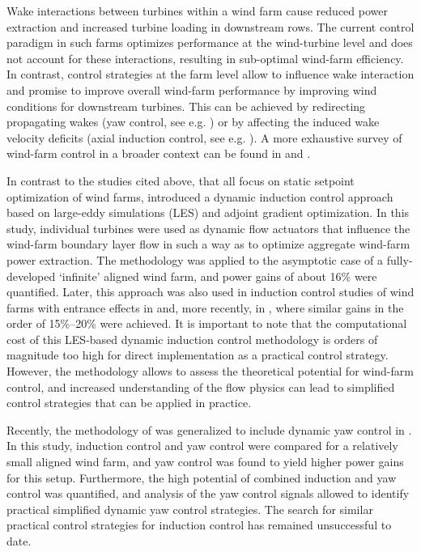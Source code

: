 \documentclass[wes, manuscript]{copernicus}
\begin{document}


\introduction  %
Wake interactions between turbines within a wind farm cause reduced power extraction and increased turbine loading in downstream rows. The current control paradigm in such farms optimizes performance at the wind-turbine level and does not account for these interactions, resulting in sub-optimal wind-farm efficiency. In contrast, control strategies at the farm level allow to influence wake interaction and promise to improve overall wind-farm performance by improving wind conditions for downstream turbines. This can be achieved by redirecting propagating wakes (yaw control, see e.g. \citealp{fleming2014evaluating, gebraad2016wind, campagnolo2016wind}) or by affecting the induced wake velocity deficits (axial induction control, see e.g. \citealp{nilsson2015large, annoni2016analysis, bartl2016experimental}). A more exhaustive survey of wind-farm control in a broader context can be found in \cite{knudsen2015survey} and \cite{boersma2017tutorial}. 

In contrast to the studies cited above, that all focus on static setpoint optimization of wind farms, \cite{goit2015optimal} introduced a dynamic induction control approach based on large-eddy simulations (LES) and adjoint gradient optimization. In this study, individual turbines were used as dynamic flow actuators that influence the wind-farm boundary layer flow in such a way as to optimize aggregate wind-farm power extraction. The methodology was applied to the asymptotic case of a fully-developed `infinite' aligned wind farm, and power gains of about 16\% were quantified. Later, this approach was also used in induction control studies of wind farms with entrance effects in \cite{goit2016optimal} and, more recently, in \cite{munters2017optimal}, where similar gains in the order of 15\%--20\% were achieved. 
It is important to note that the computational cost of this LES-based dynamic induction control methodology is orders of magnitude too high for direct implementation as a practical control strategy. However, the methodology allows to assess the theoretical potential for wind-farm control, and increased understanding of the flow physics can lead to simplified control strategies that can be applied in practice.  

Recently, the methodology of \cite{goit2015optimal} was generalized to include dynamic yaw control in \cite{munters2018dynamic}. In this study, induction control and yaw control were compared for a relatively small aligned wind farm, and yaw control was found to yield higher power gains for this setup. Furthermore, the high potential of combined induction and yaw control was quantified, and analysis of the yaw control signals allowed to identify practical simplified dynamic yaw control strategies. The search for similar practical control strategies for induction control has remained unsuccessful to date. 
\end{document}
